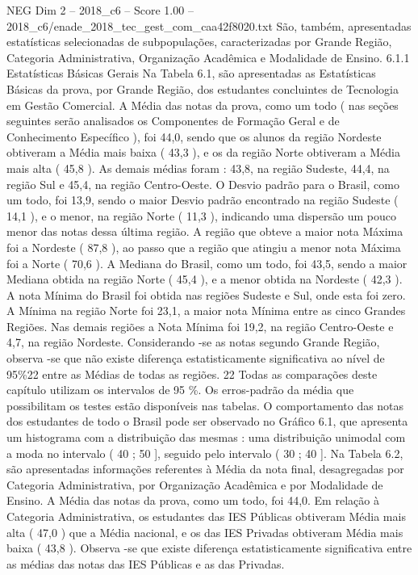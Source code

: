 \begin{textsample}{NEG Dim 2 – 2018\_c6 – Score 1.00 – 2018\_c6/enade\_2018\_tec\_gest\_com\_caa42f8020.txt}
São, também, apresentadas estatísticas selecionadas de subpopulações, caracterizadas por Grande Região, Categoria Administrativa, Organização Acadêmica e Modalidade de Ensino. 6.1.1 Estatísticas Básicas Gerais Na Tabela 6.1, são apresentadas as Estatísticas Básicas da prova, por Grande Região, dos estudantes concluintes de Tecnologia em Gestão Comercial.
A Média das notas da prova, como um todo ( nas seções seguintes serão analisados os Componentes de Formação Geral e de Conhecimento Específico ), foi 44,0, sendo que os alunos da região Nordeste obtiveram a Média mais baixa ( 43,3 ), e os da região Norte obtiveram a Média mais alta ( 45,8 ).
As demais médias foram : 43,8, na região Sudeste, 44,4, na região Sul e 45,4, na região Centro-Oeste.
O Desvio padrão para o Brasil, como um todo, foi 13,9, sendo o maior Desvio padrão encontrado na região Sudeste ( 14,1 ), e o menor, na região Norte ( 11,3 ), indicando uma dispersão um pouco menor das notas dessa última região.
A região que obteve a maior nota Máxima foi a Nordeste ( 87,8 ), ao passo que a região que atingiu a menor nota Máxima foi a Norte ( 70,6 ).
A Mediana do Brasil, como um todo, foi 43,5, sendo a maior Mediana obtida na região Norte ( 45,4 ), e a menor obtida na Nordeste ( 42,3 ).
A nota Mínima do Brasil foi obtida nas regiões Sudeste e Sul, onde esta foi zero.
A Mínima na região Norte foi 23,1, a maior nota Mínima entre as cinco Grandes Regiões.
Nas demais regiões a Nota Mínima foi 19,2, na região Centro-Oeste e 4,7, na região Nordeste.
Considerando -se as notas segundo Grande Região, observa -se que não existe diferença estatisticamente significativa ao nível de 95\%22 entre as Médias de todas as regiões. 22 Todas as comparações deste capítulo utilizam os intervalos de 95 \%.
Os erros-padrão da média que possibilitam os testes estão disponíveis nas tabelas.
O comportamento das notas dos estudantes de todo o Brasil pode ser observado no Gráfico 6.1, que apresenta um histograma com a distribuição das mesmas : uma distribuição unimodal com a moda no intervalo ( 40 ; 50 ], seguido pelo intervalo ( 30 ; 40 ].
Na Tabela 6.2, são apresentadas informações referentes à Média da nota final, desagregadas por Categoria Administrativa, por Organização Acadêmica e por Modalidade de Ensino.
A Média das notas da prova, como um todo, foi 44,0.
Em relação à Categoria Administrativa, os estudantes das IES Públicas obtiveram Média mais alta ( 47,0 ) que a Média nacional, e os das IES Privadas obtiveram Média mais baixa ( 43,8 ).
Observa -se que existe diferença estatisticamente significativa entre as médias das notas das IES Públicas e as das Privadas.

\end{textsample}
